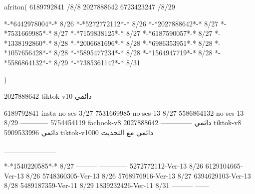 afriton(
6189792841 /8/8
2027888642
6723423247 /8/29

*-*6442978004*-* 8/26
*-*5272772112*-* 8/26
*-*2027888642*-* 8/27
*-*7531669985*-* 8/27
*-*7159838125*-* 8/27
*-*6187590057*-* 8/27
*-*1338192860*-* 8/28
*-*2006681696*-* 8/28
*-*6986353951*-* 8/28
*-*1057656428*-* 8/28
*-*5895477234*-* 8/28
*-*1564947719*-* 8/28
*-*5586864132*-* 8/29
*-*7385361142*-* 8/31

)

2027888642 tiktok-v10
دائمي

6189792841 insta no ses
3/27
7531669985-no-ses-13
8/27
5586864132-no-ses-13
8/29
------------
5754454119 facbook-v8
دائمي
--------------
2027888642 tiktok-v8
دائمي
5909533996 tiktok-v1000
دائمي مع التحديث

__________

*-*1540220585*-* 8/27
---------
------------
5272772112-Ver-13
8/26
6129104665-Ver-13
8/26
5748360305-Ver-13
8/26
5768976916-Ver-13
8/27
6394629103-Ver-13
8/28
5489187359-Ver-11
8/29
1839232426-Ver-11
8/31
---------
------
